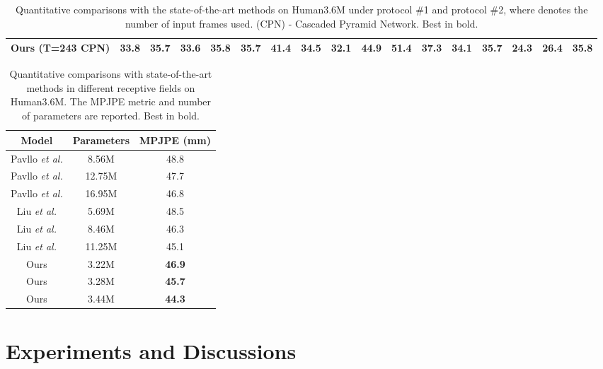 \documentclass[10pt,twocolumn,letterpaper]{article}
\begin{document}
\begin{table*}[t]
{\begin{tabular}{@{}l|ccccccccccccccc|c@{}}
			\midrule[0.5pt]
         Ours (T=243 CPN) &33.8 &35.7 &33.6 &{35.8} &35.7 &41.4 &34.5 &32.1 &44.9 &51.4 &37.3 &34.1 &35.7 &24.3 &26.4 &\textbf{35.8} \\
         
         \toprule[1pt]
		\end{tabular}
	}
	\caption
	{
      Quantitative comparisons with the state-of-the-art methods on Human3.6M under protocol \#1 and protocol \#2,
      where  denotes the number of input frames used. 
      (CPN) - Cascaded Pyramid Network.
      Best in bold. 
}
	\label{table:h36m}
\end{table*}

\begin{table}[t]
   \centering  
   \small
   \setlength{\tabcolsep}{2.45mm} 
 
   \begin{tabular}{ccc}
     \toprule [1pt]
     Model &Parameters &MPJPE (mm)\\
      \midrule [0.5pt]  

      Pavllo \emph{et al.} \cite{pavllo20193d}  &8.56M &48.8 \\
      Pavllo \emph{et al.} \cite{pavllo20193d}  &12.75M &47.7 \\
      Pavllo \emph{et al.} \cite{pavllo20193d}  &16.95M &46.8 \\
      \midrule[0.5pt] 

      Liu \emph{et al.} \cite{liu2020attention}  &5.69M &48.5 \\
      Liu \emph{et al.} \cite{liu2020attention}  &8.46M &46.3 \\
      Liu \emph{et al.} \cite{liu2020attention}  &11.25M &45.1 \\
      \midrule[0.5pt] 

      Ours  &3.22M &\textbf{46.9} \\
      Ours  &3.28M &\textbf{45.7} \\
      Ours  &3.44M &\textbf{44.3} \\
      \toprule [1pt]
   \end{tabular}
     \caption
     {
         Quantitative comparisons with state-of-the-art methods in different receptive fields on Human3.6M.
         The MPJPE metric and number of parameters are reported. 
         Best in bold. 
     }
   \label{table:compare}
 \end{table}

\section{Experiments and Discussions}
\end{document}
